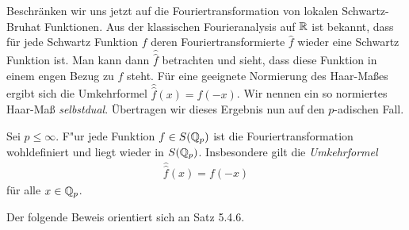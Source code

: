 		Beschränken wir uns jetzt auf die Fouriertransformation von lokalen Schwartz-Bruhat Funktionen.
		Aus der klassischen Fourieranalysis auf $\mathbb{R}$ ist bekannt, dass für jede Schwartz Funktion $f$ deren Fouriertransformierte $\hat{f}$ wieder eine Schwartz Funktion ist.
		Man kann dann $\hat{\hat{f}}$ betrachten und sieht, dass diese Funktion in einem engen Bezug zu $f$ steht. 
		Für eine geeignete Normierung des Haar-Maßes ergibt sich die Umkehrformel $\hat{\hat{f}}(x)=f(-x)$.
		Wir nennen ein so normiertes Haar-Maß \emph{selbstdual}.
		Übertragen wir dieses Ergebnis nun auf den $p$-adischen Fall.
		\begin{satz}\label{satz:lokal:umkehrformel}
			Sei $p\leq\infty$. F"ur jede Funktion $f\in S({\mathbb{Q}_p})$ ist die Fouriertransformation wohldefiniert und liegt wieder in $S({\mathbb{Q}_p})$. Insbesondere gilt die \emph{Umkehrformel}
			\begin{align*}
				\hat{\hat{f}}(x) = f(-x)
			\end{align*}
			für alle $x\in {\mathbb{Q}_p}$.
		\end{satz}
		Der folgende Beweis orientiert sich an \textcite{deitmar2010} Satz 5.4.6.
